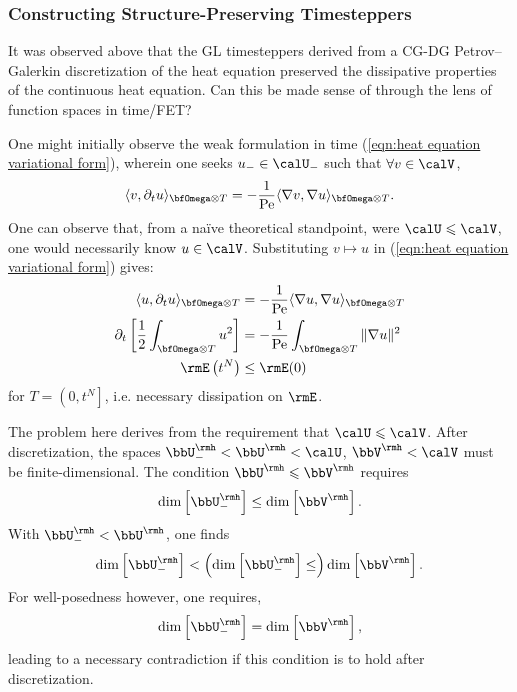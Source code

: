 \subsubsection{Constructing Structure-Preserving Timesteppers}
    It was observed above that the GL timesteppers derived from a CG-DG Petrov--Galerkin discretization of the heat equation preserved the dissipative properties of the continuous heat equation. Can this be made sense of through the lens of function spaces in time/FET?

    One might initially observe the weak formulation in time (\ref{eqn:heat equation variational form}), wherein one seeks $u_{-}  \in  \calU_{-}$ such that $\forall  v  \in  \calV$,
    \begin{equation*}
        \langle v, \partial_{t}u\rangle_{\bfOmega\otimes T}  =   - \frac{1}{\rmPe}\langle\nabla v, \nabla u\rangle_{\bfOmega\otimes T}.
    \end{equation*}
    One can observe that, from a naïve theoretical standpoint, were $\calU  \leqslant  \calV$, one would necessarily know $u  \in  \calV$. Substituting $v  \mapsto  u$ in (\ref{eqn:heat equation variational form}) gives:
    \begin{align}
        \langle u, \partial_{t}u\rangle_{\bfOmega\otimes T}  &=   - \frac{1}{\rmPe}\langle\nabla u, \nabla u\rangle_{\bfOmega\otimes T}  \label{eqn:heat equation dissipation proof 1}  \\
        \partial_{t}\left[\frac{1}{2}\int_{\bfOmega\otimes T}u^{2}\right]  &=   - \frac{1}{\rmPe}\int_{\bfOmega\otimes T}\|\nabla u\|^{2}  \\
        \rmE\left(t^{N}\right)  &\leq  \rmE(0)  \label{eqn:heat equation dissipation proof 3}
    \end{align}
    for $T  =  \left(0, t^{N}\right]$, i.e. necessary dissipation on $\rmE$.
    
    The problem here derives from the requirement that $\calU  \leqslant  \calV$. After discretization, the spaces $\bbU^{\rmh}_{-}  <  \bbU^{\rmh}  <  \calU$, $\bbV^{\rmh}  <  \calV$ must be finite-dimensional. The condition $\bbU^{\rmh}  \leqslant  \bbV^{\rmh}$ requires
    \begin{equation}
        \dim\left[\bbU^{\rmh}_{-}\right]  \leq  \dim\left[\bbV^{\rmh}\right].
    \end{equation}
    With $\bbU^{\rmh}_{-}  <  \bbU^{\rmh}$, one finds
    \begin{equation}
        \dim\left[\bbU^{\rmh}_{-}\right]  <  \left(\dim\left[\bbU^{\rmh}_{-}\right]  \leq\right)  \dim\left[\bbV^{\rmh}\right].
    \end{equation}
    For well-posedness however, one requires,
    \begin{equation}
        \dim\left[\bbU^{\rmh}_{-}\right]  =  \dim\left[\bbV^{\rmh}\right],
    \end{equation}
    leading to a necessary contradiction if this condition is to hold after discretization. \contra

